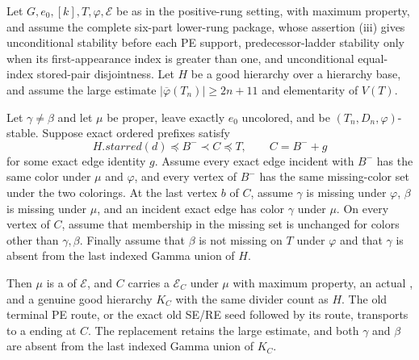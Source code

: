 \begin{lemma}
Let $G,e_0,[k],T,\varphi,\mathcal E$ be as in the positive-rung setting,
with maximum property, and assume the complete six-part lower-rung package, whose assertion (iii) gives
unconditional stability before each PE support, predecessor-ladder stability
only when its first-appearance index is greater than one, and unconditional
equal-index stored-pair disjointness.
Let $H$ be a good hierarchy over a hierarchy base, and assume the large
estimate $|\overline\varphi(T_n)|\geq2n+11$ and elementarity of $V(T)$.

Let $\gamma\ne\beta$ and let $\mu$ be proper, leave exactly $e_0$
uncolored, and be $(T_n,D_n,\varphi)$-stable.  Suppose exact ordered
prefixes satisfy
\[
 H.\mathit{starred}(d)\preccurlyeq B^-\prec C\preccurlyeq T,
 \qquad C=B^-+g
\]
for some exact edge identity $g$.  Assume every exact edge incident with
$B^-$ has the same color under $\mu$ and $\varphi$, and every vertex of
$B^-$ has the same missing-color set under the two colorings.  At the last
vertex $b$ of $C$, assume $\gamma$ is missing under $\varphi$, $\beta$ is
missing under $\mu$, and an incident exact edge has color $\gamma$ under
$\mu$.  On every vertex of $C$, assume that membership in the missing set
is unchanged for colors other than $\gamma,\beta$.  Finally assume that
$\beta$ is not missing on $T$ under $\varphi$ and that $\gamma$ is absent
from the last indexed Gamma union of $H$.

Then $\mu$ is a  of $\mathcal E$, and $C$ carries a
 $\mathcal E_C$ under $\mu$
with maximum property, an actual , and a genuine
good hierarchy $K_C$ with the same divider count as $H$.  The old terminal
PE route, or the exact old SE/RE seed followed by its route, transports to
a  ending at $C$.  The replacement
retains the large estimate, and both $\gamma$ and $\beta$ are absent from
the last indexed Gamma union of $K_C$.
\end{lemma}
